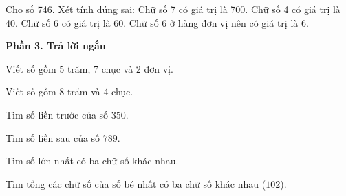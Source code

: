 \begin{ex} %
Cho số 746. Xét tính đúng sai:
\choiceTF
{\True Chữ số 7 có giá trị là 700.}
{\True Chữ số 4 có giá trị là 40.}
{Chữ số 6 có giá trị là 60.}
{\True Chữ số 6 ở hàng đơn vị nên có giá trị là 6.}
\end{ex}

\textbf{Phần 3. Trả lời ngắn}

\begin{ex} %
Viết số gồm 5 trăm, 7 chục và 2 đơn vị.
\end{ex}

\begin{ex} %
Viết số gồm 8 trăm và 4 chục.
\end{ex}

\begin{ex} %
Tìm số liền trước của số $350$.
\end{ex}

\begin{ex} %
Tìm số liền sau của số $789$.
\end{ex}

\begin{ex} %
Tìm số lớn nhất có ba chữ số khác nhau.
\end{ex}

\begin{ex} %
Tìm tổng các chữ số của số bé nhất có ba chữ số khác nhau ($102$).
\end{ex}
